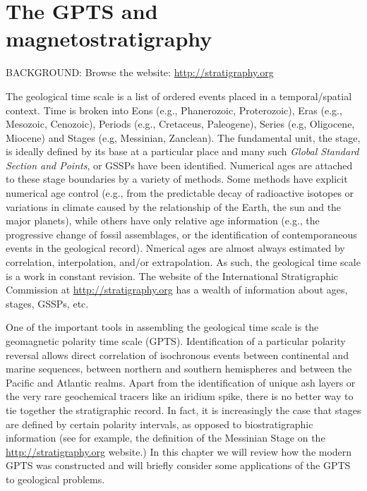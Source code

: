 \chapter{The GPTS and magnetostratigraphy}


\noindent
BACKGROUND: 
Browse the website:  \url{http://stratigraphy.org}  
\vskip 6pt

The geological time scale is a list of ordered events placed in a temporal/spatial context.  Time  is broken into Eons (e.g., Phanerozoic, Proterozoic), Eras (e.g., Mesozoic, Cenozoic),  Periods (e.g., Cretaceus, Paleogene), Series (e.g, Oligocene, Miocene) and Stages (e.g, Messinian, Zanclean).   The fundamental unit, the stage, is ideally defined by its base at a particular place and many such  
{\it Global Standard Section and Points}, or GSSPs have been identified.  Numerical ages are attached to these stage boundaries by a variety of methods.    Some methods have explicit numerical age control (e.g., from the predictable decay of radioactive isotopes or  variations in climate caused by the relationship of the Earth, the sun and the major planets), while others have only relative age  information (e.g., the progressive change  of fossil assemblages, or the identification of contemporaneous events in the geological record).   Nmerical ages are almost always estimated by correlation, interpolation,  and/or extrapolation.  As such, the geological time scale is a work in constant revision.  The website of the International Stratigraphic Commission at \url{http://stratigraphy.org} has a wealth of information about ages, stages, GSSPs, etc.

One of the important tools in assembling the geological time scale is the  
geomagnetic polarity time scale (GPTS).  
Identification of a particular polarity reversal allows direct correlation of isochronous events between continental and marine sequences, between northern and southern hemispheres and between the Pacific and Atlantic realms.  Apart from the identification of unique ash layers or the very rare geochemical tracers like an iridium spike, there is no better way to tie together the stratigraphic record.  In fact, it is increasingly the case that stages are defined by certain polarity intervals, as opposed to biostratigraphic information (see for example, the definition of the Messinian Stage on the \url{http://stratigraphy.org} website.)   In this chapter we will review how the modern GPTS was constructed and will briefly consider some applications of the GPTS to geological problems.  



